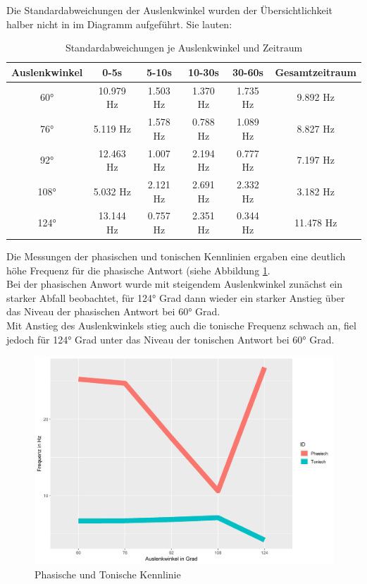\documentclass[a4paper]{article}
\begin{document}
\noindent Die Standardabweichungen der Auslenkwinkel wurden der Übersichtlichkeit halber nicht in im Diagramm aufgeführt. Sie lauten:
\begin{table}[H]
    \centering
    \caption{Standardabweichungen je Auslenkwinkel und Zeitraum}
    \begin{tabular}{c|c|c|c|c|c}
         Auslenkwinkel & 0-5s & 5-10s & 10-30s & 30-60s & Gesamtzeitraum \\
         \hline
         \ang{60} & 10.979 Hz & 1.503 Hz & 1.370 Hz & 1.735 Hz & 9.892 Hz \\
         \ang{76} & 5.119 Hz & 1.578 Hz & 0.788 Hz & 1.089 Hz & 8.827 Hz \\
         \ang{92} & 12.463 Hz & 1.007 Hz & 2.194 Hz & 0.777 Hz & 7.197 Hz \\
         \ang{108} & 5.032 Hz & 2.121 Hz & 2.691 Hz & 2.332 Hz & 3.182 Hz \\
         \ang{124} & 13.144 Hz & 0.757 Hz & 2.351 Hz & 0.344 Hz & 11.478 Hz \\
    \end{tabular}
    \label{tab:A2_sd}
\end{table}
\noindent Die Messungen der phasischen und tonischen Kennlinien ergaben eine deutlich höhe Frequenz für die phasische Antwort (siehe Abbildung \ref{fig:mA2plot2}.\\
Bei der phasischen Anwort wurde mit steigendem Auslenkwinkel zunächst ein starker Abfall beobachtet, für \ang{124} Grad dann wieder ein starker Anstieg über das Niveau der phasischen Antwort bei \ang{60} Grad.\\
Mit Anstieg des Auslenkwinkels stieg auch die tonische Frequenz schwach an, fiel jedoch für \ang{124} Grad unter das Niveau der tonischen Antwort bei \ang{60} Grad.
\begin{figure}[H]
    \centering
    \includegraphics[scale=0.8]{images/a2plot2.png}
    \caption{Phasische und Tonische Kennlinie}
    \label{fig:mA2plot2}
\end{figure}
\end{document}
